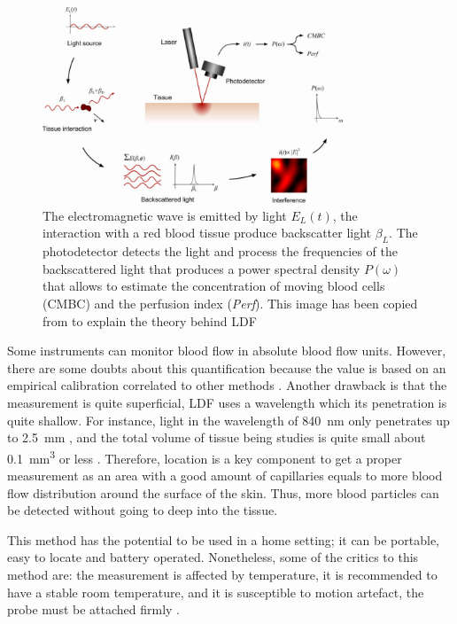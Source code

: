 \begin{figure}[!htpb]
	\centering
	\includegraphics[width=0.8\textwidth,keepaspectratio]{LDF}    
	\caption[Laser Doppler flowmetry theory overview]{The electromagnetic wave is emitted by light $E_L(t)$, the interaction with a red blood tissue produce backscatter light $\beta_L$. The photodetector detects the light and process the frequencies of the backscattered light that produces a power spectral density $P(\omega)$ that allows to estimate the concentration of moving blood cells (CMBC) and the perfusion index (\textit{Perf}). This image has been copied from \cite{fredriksson2007laser} to explain the theory behind LDF}
	\label{fig:LDF method}
\end{figure}

Some instruments can monitor blood flow in absolute blood flow units. However, there are some doubts about this quantification because the value is based on an empirical calibration correlated to other methods \cite{cooke1990laser}. Another drawback is that the measurement is quite superficial, LDF uses a wavelength which its penetration is quite shallow. For instance, light in the wavelength of \SI{840}{\nano \metre} only penetrates up to \SI{2.5}{\milli\metre} \cite{bashkatov2005optical}, and the total volume of tissue being studies is quite small about \SI{0.1}{\cubic\mm} or less \cite{briers2013laser}. Therefore, location is a key component to get a proper measurement as an area with a good amount of capillaries equals to more blood flow distribution around the surface of the skin. Thus, more blood particles can be detected without going to deep into the tissue. 

This method has the potential to be used in a home setting; it can be portable, easy to locate and battery operated. Nonetheless, some of the critics to this method are: the measurement is affected by temperature, it is recommended to have a stable room temperature, and it is susceptible to motion artefact, the probe must be attached firmly \cite{fredriksson2007laser}. 

